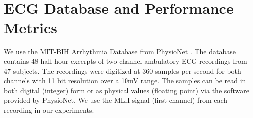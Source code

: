 \section{ECG Database and Performance Metrics}
\label{sec:data}

We use the MIT-BIH Arrhythmia Database \cite{moody2001impact}
from PhysioNet \cite{goldberger2000physiobank}.
The database contains 48 half hour excerpts of two channel
ambulatory ECG recordings from 47 subjects.
The recordings were digitized at 360 samples per second
for both channels with 11 bit resolution over a 10mV range.
The samples can be read in both digital (integer) form or
as physical values (floating point) via the software provided
by PhysioNet.
We use the MLII signal (first channel)
from each recording in our experiments.

